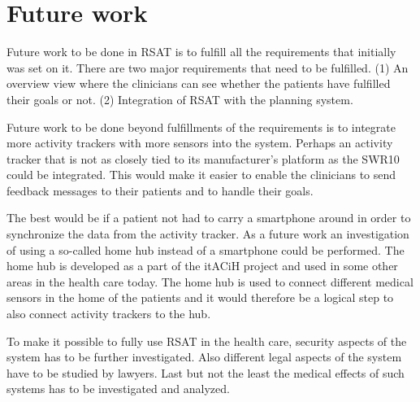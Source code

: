 \documentclass{cslthse-msc}
\begin{document}






\section{Future work}

Future work to be done in RSAT is to fulfill all the requirements that initially was set on it. There are two major requirements that need to be fulfilled. (1) An overview view where the clinicians can see whether the patients have fulfilled their goals or not. (2) Integration of RSAT with the planning system. 

Future work to be done beyond fulfillments  of the requirements is to integrate more activity trackers with more sensors into the system.  Perhaps an activity tracker that is not as closely tied to its manufacturer’s platform as the SWR10 could be integrated. This would make it easier to enable the clinicians to send feedback messages to their patients and to handle their goals. 

The best would be if a patient not had to carry a smartphone around in order to synchronize the data from the activity tracker. As a future work an investigation of using a so-called home hub instead of a smartphone could be performed. The home hub is developed as a part of the itACiH project and used in some other areas in the health care today. The home hub is  used to connect different medical sensors in the home of the patients and it would therefore be a logical step to also connect activity trackers to the hub. 

To make it possible to fully use RSAT in the health care, security aspects of the system has to be further investigated. Also different legal aspects of the system have to be studied by lawyers. Last but not the least the medical effects of such systems has to be investigated and analyzed. 
\end{document}
